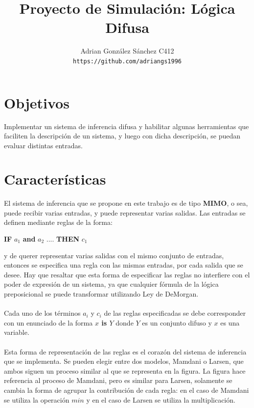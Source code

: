 \documentclass[a4paper, 12pt]{article}
\begin{document}
\title{Proyecto de Simulaci\'on: L\'ogica Difusa}
\author{
   Adrian Gonz\'alez S\'anchez C412\\
   \texttt{https://github.com/adriangs1996}
}
\maketitle
\section*{Objetivos}
Implementar un sistema de inferencia difusa y habilitar algunas herramientas que faciliten
la descripci\'on de un sistema, y luego con dicha descripci\'on, se puedan evaluar distintas
entradas.

\section*{Caracter\'isticas}
\paragraph{}
El sistema de inferencia que se propone en este trabajo es de tipo \textbf{MIMO}, o sea, puede recibir varias entradas, y puede representar
varias salidas. Las entradas se definen mediante reglas de la forma:

\textbf{IF} $a_1$ \textbf{and} $a_2$ .... \textbf{THEN} $c_1$

y de querer representar varias salidas con el mismo conjunto de entradas, entonces se especifica
una regla con las mismas entradas, por cada salida que se desee. Hay que resaltar que esta forma
de especificar las reglas no interfiere con el poder de expresi\'on de un sistema, ya que cualquier
f\'ormula de la l\'ogica preposicional se puede transformar utilizando Ley de DeMorgan.

\paragraph{}
Cada uno de los t\'erminos $a_i$ y $c_i$ de las reglas especificadas se debe corresponder con un enunciado
de la forma \textbf{$x$ is $Y$} donde $Y$ es un conjunto difuso y $x$ es una variable.

\paragraph{}
Esta forma de representaci\'on de las reglas es el coraz\'on del sistema de inferencia que se implementa.
Se pueden elegir entre dos modelos, Mamdani o Larsen, que ambos siguen un proceso similar al 
que se representa en la figura. La figura hace referencia al proceso de Mamdani, pero es similar para Larsen,
solamente se cambia la forma de agrupar la contribuci\'on de cada regla: en el caso de Mamdani se utiliza
la operaci\'on $min$ y en el caso de Larsen se utiliza la multiplicaci\'on.
\end{document}
